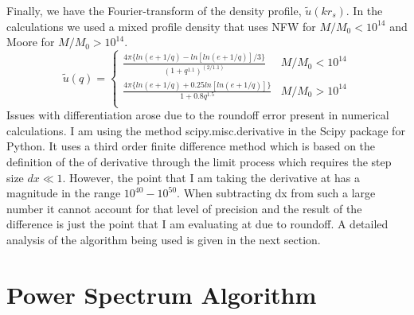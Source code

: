 \documentclass[12pt]{article}
\begin{document}
Finally, we have the Fourier-transform of the density profile, $\tilde{u}(kr_{s})$. In the calculations we used a mixed profile density that uses NFW for $M/M_0 < 10^{14}$ and Moore for $M/M_0 > 10^{14}$.
\begin{equation} \label{DP}
	\tilde{u}(q) = 
	\begin{cases}
		\frac{4\pi\{ln(e+1/q)-ln[ln(e+1/q)]/3\}}{(1+q^{1.1})^{(2/1.1)}} &  M/M_0 < 10^{14} \\
		\frac{4\pi\{ln(e+1/q)+0.25ln[ln(e+1/q)]\}}{1+0.8q^{1.5}} &  M/M_0 > 10^{14} \\
	\end{cases}
\end{equation}
Issues with differentiation arose due to the roundoff error present in numerical calculations. I am using the method scipy.misc.derivative in the Scipy package for Python. It uses a third order finite difference method which is based on the definition of the of derivative through the limit process which requires the step size $dx \ll 1$. However, the point that I am taking the derivative at has a magnitude in the range $10^{40}-10^{50}$. When subtracting dx from such a large number it cannot account for that level of precision and the result of the difference is just the point that I am evaluating at due to roundoff. A detailed analysis of the algorithm being used is given in the next section.

\section{Power Spectrum Algorithm}
\end{document}
